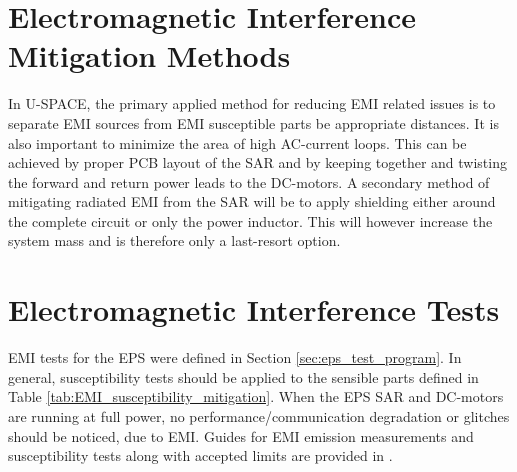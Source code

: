 \section{Electromagnetic Interference Mitigation Methods}
In \ac{U-SPACE}, the primary applied method for reducing \ac{EMI} related issues is to separate \ac{EMI} sources from \ac{EMI} susceptible parts be appropriate distances. It is also important to minimize the area of high AC-current loops. This can be achieved by proper \ac{PCB} layout of the \ac{SAR} and by keeping together and twisting the forward and return power leads to the DC-motors. A secondary method of mitigating radiated \ac{EMI} from the \ac{SAR} will be to apply shielding either around the complete circuit or only the power inductor. This will however increase the system mass and is therefore only a last-resort option.
%
%
\section{Electromagnetic Interference Tests}
\ac{EMI} tests for the \ac{EPS} were defined in Section \ref{sec:eps_test_program}. In general, susceptibility tests should be applied to the sensible parts defined in Table \ref{tab:EMI_susceptibility_mitigation}. When the \ac{EPS} \ac{SAR} and DC-motors are running at full power, no performance/communication degradation or glitches should be noticed, due to \ac{EMI}. Guides for \ac{EMI} emission measurements and susceptibility tests along with accepted limits are provided in \cite{ECSS_EMC}.
%
%
